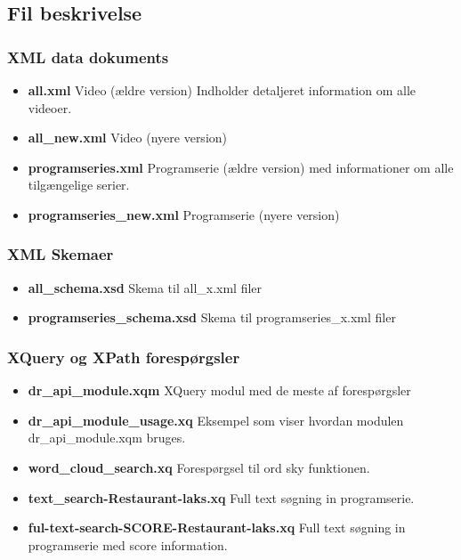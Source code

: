 \subsection{Fil beskrivelse}


\subsubsection{XML data dokuments}

\begin{itemize}
\item \textbf{all.xml} Video (ældre version) Indholder detaljeret information om alle videoer.
\item \textbf{all\_new.xml} Video (nyere version)
\item \textbf{programseries.xml} Programserie (ældre version) med informationer om alle tilgængelige serier.
\item \textbf{programseries\_new.xml} Programserie (nyere version)
\end{itemize}



\subsubsection{XML Skemaer}

\begin{itemize}
\item \textbf{all\_schema.xsd} Skema til all\_x.xml filer
\item \textbf{programseries\_schema.xsd} Skema til programseries\_x.xml filer
\end{itemize}


\subsubsection{XQuery og XPath forespørgsler}

\begin{itemize}
\item \textbf{dr\_api\_module.xqm} XQuery modul med de meste af forespørgsler
\item \textbf{dr\_api\_module\_usage.xq} Eksempel som viser hvordan modulen dr\_api\_module.xqm bruges.
\item \textbf{word\_cloud\_search.xq} Forespørgsel til ord sky funktionen.
\item \textbf{text\_search-Restaurant-laks.xq} Full text søgning in programserie.
\item \textbf{ful-text-search-SCORE-Restaurant-laks.xq} Full text søgning in programserie med score information.

\end{itemize}


